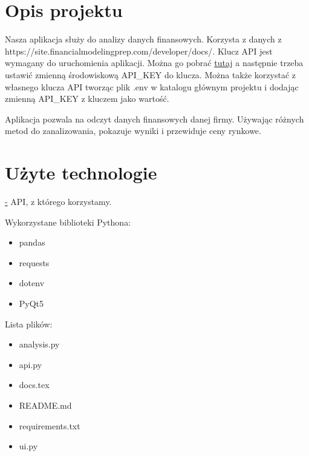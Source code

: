 \documentclass[12pt]{article}
\begin{document}
	\maketitle
	
	\section{Opis projektu}\label{sec:opis-projektu}
	Nasza aplikacja służy do analizy danych finansowych.
	Korzysta z danych z https://site.financialmodelingprep.com/developer/docs/.
	Klucz API jest wymagany do uruchomienia aplikacji.
	Można go pobrać \href{https://site.financialmodelingprep.com/login}{tutaj} a następnie
	trzeba ustawić zmienną środowiskową API\_KEY do klucza.
	Można także korzystać z własnego klucza API tworząc plik .env w katalogu głównym projektu i
	dodając zmienną API\_KEY z kluczem jako wartość.

	Aplikacja pozwala na odczyt danych finansowych danej firmy.
	Używając różnych metod do zanalizowania, pokazuje wyniki i przewiduje ceny rynkowe.

	\section{Użyte technologie}\label{sec:uzyte-echnologie}
	 \href{https://site.financialmodelingprep.com/developer/docs/} - API, z którego korzystamy.

	 Wykorzystane biblioteki Pythona:
	\begin{itemize}
		\item pandas
		\item requests
		\item dotenv
		\item PyQt5
	\end{itemize}

	Lista plików:
	\begin{itemize}
		\item analysis.py
		\item api.py
		\item docs.tex
		\item README.md
		\item requirements.txt
		\item ui.py
	\end{itemize}
\end{document}
